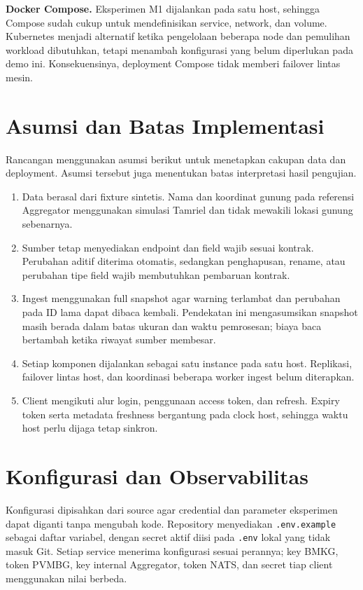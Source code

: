 \textbf{Docker Compose.} Eksperimen M1 dijalankan pada satu host, sehingga Compose sudah cukup untuk mendefinisikan service, network, dan volume. Kubernetes menjadi alternatif ketika pengelolaan beberapa node dan pemulihan workload dibutuhkan, tetapi menambah konfigurasi yang belum diperlukan pada demo ini. Konsekuensinya, deployment Compose tidak memberi failover lintas mesin.

\section{Asumsi dan Batas Implementasi}
Rancangan menggunakan asumsi berikut untuk menetapkan cakupan data dan deployment. Asumsi tersebut juga menentukan batas interpretasi hasil pengujian.
\begin{enumerate}
\item Data berasal dari fixture sintetis. Nama dan koordinat gunung pada referensi Aggregator menggunakan simulasi Tamriel dan tidak mewakili lokasi gunung sebenarnya.
\item Sumber tetap menyediakan endpoint dan field wajib sesuai kontrak. Perubahan aditif diterima otomatis, sedangkan penghapusan, rename, atau perubahan tipe field wajib membutuhkan pembaruan kontrak.
\item Ingest menggunakan full snapshot agar warning terlambat dan perubahan pada ID lama dapat dibaca kembali. Pendekatan ini mengasumsikan snapshot masih berada dalam batas ukuran dan waktu pemrosesan; biaya baca bertambah ketika riwayat sumber membesar.
\item Setiap komponen dijalankan sebagai satu instance pada satu host. Replikasi, failover lintas host, dan koordinasi beberapa worker ingest belum diterapkan.
\item Client mengikuti alur login, penggunaan access token, dan refresh. Expiry token serta metadata freshness bergantung pada clock host, sehingga waktu host perlu dijaga tetap sinkron.
\end{enumerate}

\section{Konfigurasi dan Observabilitas}
Konfigurasi dipisahkan dari source agar credential dan parameter eksperimen dapat diganti tanpa mengubah kode. Repository menyediakan \texttt{.env.example} sebagai daftar variabel, dengan secret aktif diisi pada \texttt{.env} lokal yang tidak masuk Git. Setiap service menerima konfigurasi sesuai perannya; key BMKG, token PVMBG, key internal Aggregator, token NATS, dan secret tiap client menggunakan nilai berbeda.


